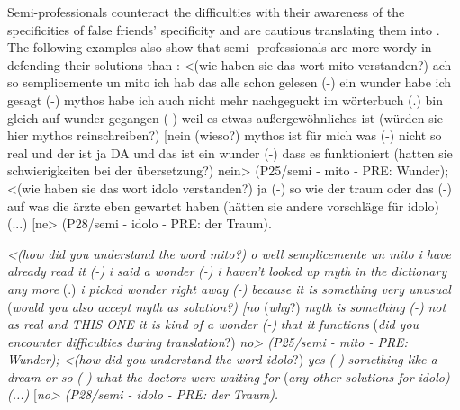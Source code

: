 \documentclass[output=paper]{langsci/langscibook.cls}
\begin{document}
Semi-professionals counteract the difficulties with their awareness of the specificities of false friends' specificity and are cautious translating them into . The following examples also show that semi- professionals are more wordy in defending their solutions than : \textsf{<(wie haben sie das wort mito verstanden?) ach so semplicemente un mito ich hab das alle schon gelesen (-) ein wunder habe ich gesagt (-) mythos habe ich auch nicht mehr nachgeguckt im wörterbuch (.) bin gleich auf wunder gegangen (-) weil es etwas außergewöhnliches ist} \textsf{(würden sie hier mythos reinschreiben?) [nein (wieso?) mythos ist für mich was (-) nicht so real und der ist ja DA und das ist ein wunder (-) dass es funktioniert (hatten sie schwierigkeiten bei der übersetzung?) nein> (P25/semi -} \textsf{mito -} \textsf{PRE: Wunder); <(wie haben sie das wort idolo verstanden?) ja (-) so wie der traum oder das (-) auf was die ärzte eben gewartet haben (hätten sie andere vorschläge für idolo) (...) [ne> (P28/semi -} \textsf{idolo -} \textsf{PRE: der Traum).}


\textsf{\textit{<(}\textit{how did you understand the word mito?) o well} \textit{semplicemente un mito} \textit{i have already read it} \textit{(-)} \textit{i said a wonder} \textit{(-)} \textit{i haven't looked up myth} \textit{in the dictionary any more} (.) \textit{i picked wonder right away} \textit{(-)} \textit{because it is something very unusual} (\textit{would you also accept myth as solution}\textit{?) [}\textit{no} (\textit{why}?) \textit{myth is something} \textit{(-)} \textit{not as real} \textit{and THIS ONE it is kind of a wonder} \textit{(-)} \textit{tha}\textit{t it} \textit{functions} (\textit{did you encounter difficulties during translation}?) \textit{no}\textit{> (P25/semi - mito - PRE: Wunder); <(}\textit{how did you understand the word idolo}?) \textit{yes} \textit{(-)} \textit{something like a dream or so} \textit{(-)} \textit{what the doctors were waiting for} (\textit{any other solutions for idolo}\textit{) (...)} [\textit{no}\textit{> (P28/semi - idolo - PRE: der Traum).} }
\end{document}
